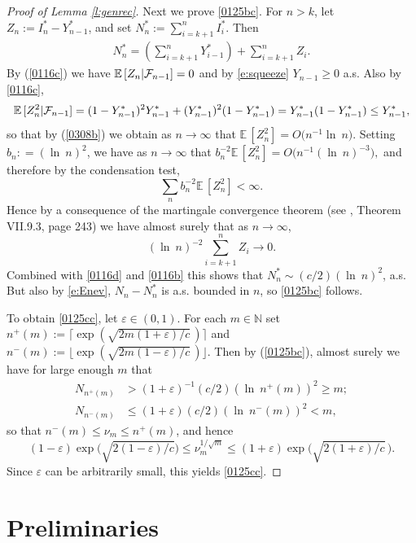 \documentclass[12pt]{article}
\newcommand{\N}{\mathbb{N}}
\newcommand{\E}{\mathbb E \,}
\newcommand{\F}{{\cal F}}
\newcommand{\eps}{\varepsilon}
\renewcommand{\log}{{\ln \:}}
\newcommand{\eqco}{\setcounter{equation}{0}}
\newcommand{\thco}{\setcounter{theo}{0}}
\newcommand{\prco}{\setcounter{prop}{0}}
\newcommand{\laco}{\setcounter{lemm}{0}}
\newcommand{\coco}{\setcounter{coro}{0}}
\newcommand{\cjco}{\setcounter{conj}{0}}
\newcommand{\deco}{\setcounter{defn}{0}}
\newcommand{\allco}{\eqco  \thco \prco \laco \coco \cjco \deco}
\begin{document}
\begin{proof}[Proof of Lemma \ref{l:genrec}]
Next we prove \eqref{0125bc}.
For $n > k$, 
let $Z_n:= I^*_n - Y^*_{n-1}$, and %
	set
	$N_n^* := \sum_{i = k+1}^n I_i^*$. Then
			\begin{align}
N^*_{n} = \left( \sum_{i = k+1}^n Y^*_{i-1} \right) 
+ \sum_{i = k+1}^n Z_i. 
\label{0116d}
			\end{align}
By (\ref{0116c}) we have $\E[Z_n|\F_{n-1}]=0$ and by
	\eqref{e:squeeze} $Y_{n-1} \geq 0$ a.s.
Also by \eqref{0116c}, 
$$
\E[Z_n^2|\F_{n-1}] = (1-Y^*_{n-1})^2 Y^*_{n-1} + (Y^*_{n-1})^2 (1-Y^*_{n-1}) 
= Y^*_{n-1}(1-Y^*_{n-1}) \leq Y_{n-1}^*,
$$ 
so that
by (\ref{0308b}) we obtain as $n \to \infty$ that
$
\E[Z_n^2] = %
 O \big(n^{-1} \log n \big).
$
Setting $b_n : = (\log n)^2$, we have 
as $n \to \infty $ that
$
b_n^{-2} \E[Z_n^2] = O \big(  n^{-1} (\log n)^{-3} \big),
$ 
and therefore  by the condensation test,
$$
\sum_n
b_n^{-2} \E[Z_n^2]  < \infty.
$$
Hence by a consequence of the martingale convergence theorem
(see \cite{Feller}, Theorem VII.9.3, page 243) we have almost surely
that as $n \to \infty$,
$$
(\log n)^{-2}  \sum_{i = k+1}^n Z_i \to 0.
$$
Combined with \eqref{0116d}
and \eqref{0116b} this shows
that $N^*_{n} \sim (c/2) (\log n)^2$, a.s.
But also by \eqref{e:Enev}, $N_{n} - N_{n}^*$ is a.s.
bounded in $n$, so
 \eqref{0125bc} follows.

To obtain \eqref{0125cc}, let $\eps \in (0,1)$.
For each $m \in \N$ set
$n^+(m) := \lceil \exp( \sqrt{2m(1+\eps)/c} \, ) \rceil$
and
$n^-(m) := \lfloor \exp( \sqrt{2m(1-\eps)/c} \, ) \rfloor$.
Then by (\ref{0125bc}), almost surely 
we have for large enough $m$ that
\begin{align*}
	N_{n^+(m)} &  > (1+\eps)^{-1}  (c/2) (\log n^+(m))^2 \geq m;
\\
	N_{n^-(m)}  & \leq (1+\eps)  (c/2) (\log n^-(m))^2 < m,
\end{align*}
so that $n^-(m) \leq \nu_m \leq n^+(m)$, and hence
$$
(1- \eps)
\exp \big(\sqrt{2(1- \eps)/c} \big) 
\leq \nu_m^{1/\sqrt{m}} \leq
(1+ \eps) 
\exp \big( \sqrt{2(1+\eps)/c} \, \big)
.
$$
Since $\eps$ can be arbitrarily small, this yields
\eqref{0125cc}.
\end{proof}

 \section{Preliminaries}
 \allco
\end{document}
